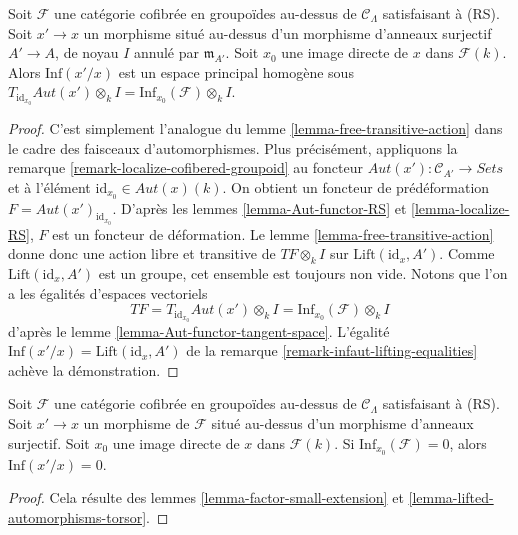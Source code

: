 \begin{lemma}
\label{lemma-lifted-automorphisms-torsor}
Soit $\mathcal{F}$ une catégorie cofibrée en groupoïdes au-dessus de
$\mathcal{C}_\Lambda$ satisfaisant à (RS). Soit $x' \to x$ un morphisme
situé au-dessus d'un morphisme d'anneaux surjectif $A' \to A$, de noyau $I$
annulé par $\mathfrak m_{A'}$. Soit $x_0$ une image directe de $x$ dans
$\mathcal{F}(k)$. Alors $\text{Inf}(x'/x)$ est un espace principal homogène
sous $T_{\text{id}_{x_0}} \mathit{Aut}(x') \otimes_k I
= \text{Inf}_{x_0}(\mathcal{F}) \otimes_k I$.
\end{lemma}

\begin{proof}
C'est simplement l'analogue du lemme \ref{lemma-free-transitive-action} dans
le cadre des faisceaux d'automorphismes. Plus précisément, appliquons la
remarque \ref{remark-localize-cofibered-groupoid} au foncteur
$\mathit{Aut}(x') : \mathcal{C}_{A'} \to \textit{Sets}$ et à l'élément
$\text{id}_{x_0} \in \mathit{Aut}(x)(k)$. On obtient un foncteur de
prédéformation $F = \mathit{Aut}(x')_{\text{id}_{x_0}}$. D'après les lemmes
\ref{lemma-Aut-functor-RS} et \ref{lemma-localize-RS}, $F$ est un foncteur de
déformation. Le lemme \ref{lemma-free-transitive-action} donne donc une action
libre et transitive de $TF \otimes_k I$ sur
$\text{Lift}(\text{id}_x, A')$. Comme
$\text{Lift}(\text{id}_x, A')$ est un groupe, cet ensemble est toujours non
vide. Notons que l'on a les égalités d'espaces vectoriels
$$
TF = T_{\text{id}_{x_0}} \mathit{Aut}(x') \otimes_k I =
\text{Inf}_{x_0}(\mathcal{F}) \otimes_k I
$$
d'après le lemme \ref{lemma-Aut-functor-tangent-space}. L'égalité
$\text{Inf}(x'/x) = \text{Lift}(\text{id}_x, A')$ de la remarque
\ref{remark-infaut-lifting-equalities} achève la démonstration.
\end{proof}

\begin{lemma}
\label{lemma-infaut-trivial}
Soit $\mathcal{F}$ une catégorie cofibrée en groupoïdes au-dessus de
$\mathcal{C}_\Lambda$ satisfaisant à (RS). Soit $x' \to x$ un morphisme de
$\mathcal{F}$ situé au-dessus d'un morphisme d'anneaux surjectif. Soit $x_0$ une
image directe de $x$ dans $\mathcal{F}(k)$. Si
$\text{Inf}_{x_0}(\mathcal{F}) = 0$, alors $\text{Inf}(x'/x) = 0$.
\end{lemma}

\begin{proof}
Cela résulte des lemmes \ref{lemma-factor-small-extension} et
\ref{lemma-lifted-automorphisms-torsor}.
\end{proof}

